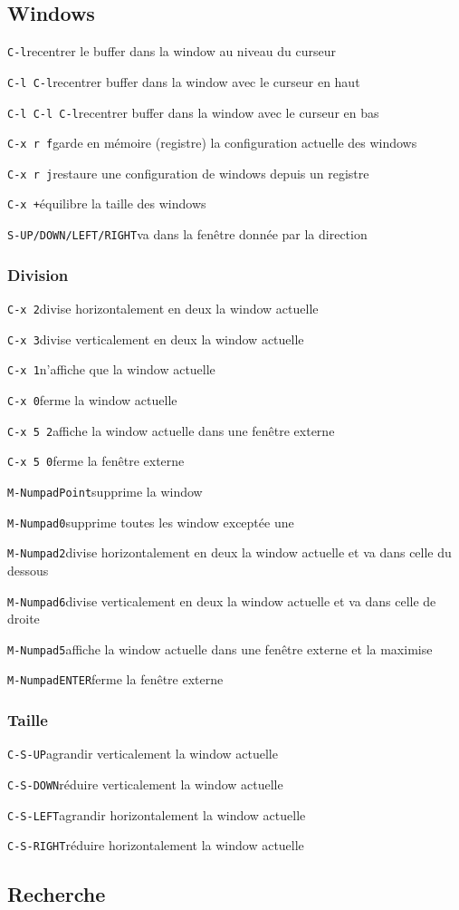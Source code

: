 \documentclass[10pt,landscape]{article}
\def\cm#1#2{{\tt#1}\dotfill#2\par}
\begin{document}
\begin{multicols}{3}
\subsection{Windows}
\cm{C-l}{recentrer le buffer dans la window au niveau du curseur}
\cm{C-l C-l}{recentrer buffer dans la window avec le curseur en haut}
\cm{C-l C-l C-l}{recentrer buffer dans la window avec le curseur en bas}
\cm{C-x r f}{garde en mémoire (registre) la configuration actuelle des windows}
\cm{C-x r j}{restaure une configuration de windows depuis un registre}
\cm{C-x +}{équilibre la taille des windows}
\cm{S-UP/DOWN/LEFT/RIGHT}{va dans la fenêtre donnée par la direction}

\subsubsection{Division}
\cm{C-x 2}{divise horizontalement en deux la window actuelle}
\cm{C-x 3}{divise verticalement en deux la window actuelle}
\cm{C-x 1}{n'affiche que la window actuelle}
\cm{C-x 0}{ferme la window actuelle}
\cm{C-x 5 2}{affiche la window actuelle dans une fenêtre externe}
\cm{C-x 5 0}{ferme la fenêtre externe}
\cm{M-NumpadPoint}{supprime la window}
\cm{M-Numpad0}{supprime toutes les window exceptée une}
\cm{M-Numpad2}{divise horizontalement en deux la window actuelle et va dans celle du dessous}
\cm{M-Numpad6}{divise verticalement en deux la window actuelle et va dans celle de droite}
\cm{M-Numpad5}{affiche la window actuelle dans une fenêtre externe et la maximise}
\cm{M-NumpadENTER}{ferme la fenêtre externe}

\subsubsection{Taille}
\cm{C-S-UP}{agrandir verticalement la window actuelle}
\cm{C-S-DOWN}{réduire verticalement la window actuelle}
\cm{C-S-LEFT}{agrandir horizontalement la window actuelle}
\cm{C-S-RIGHT}{réduire horizontalement la window actuelle}





\subsection{Recherche}


\end{multicols}
\end{document}
